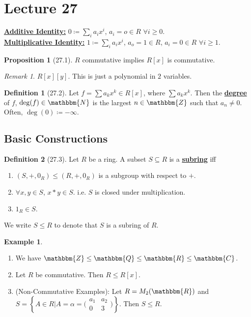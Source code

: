 \documentclass{article}
\newcommand{\N}{\mathbbm{N}}
\newcommand{\Z}{\mathbbm{Z}}
\newcommand{\Q}{\mathbbm{Q}}
\newcommand{\R}{\mathbbm{R}}
\newcommand{\C}{\mathbbm{C}}
\newcommand{\coleq}{\coloneqq}
\newcommand{\define}[1]{\textbf{\underline{#1}}}
\renewcommand{\Subset}{\subseteq}
\theoremstyle{definition}
\newtheorem*{defn}{Definition}
\newtheorem*{prop}{Proposition}
\newtheorem*{ex}{Example}
\theoremstyle{remark}
\newtheorem*{rmk}{Remark}
\begin{document}
    \section*{Lecture 27}{
        \define{Additive Identity:} $0\coleq \sum_i a_ix^i$, $a_i=o \in R$ $\forall i \geq 0$.\\
     
        \noindent\define{Multiplicative Identity:} $1\coleq \sum_i a_ix^i$, $a_o=1 \in R$, $a_i=0 \in R$ $\forall i \geq 1$.
     
        \begin{prop}[27.1]
            $R$ commutative implies $R[x]$ is commutative.
        \end{prop}
     
        \begin{rmk}
            $R[x][y]$. This is just a polynomial in $2$ variables.
        \end{rmk}
        
        \begin{defn}[27.2]
            Let $f=\sum a_kx^k \in R[x]$, where $\sum a_k x^k$. Then the \define{degree} of $f$, $\deg(f) \in \N$ is the largest $n \in \Z$ such that $a_n\neq 0$. Often, $\deg(0)\coleq -\infty$.
        \end{defn}
        
        \subsection*{Basic Constructions}{
            \begin{defn}[27.3]
                Let $R$ be a ring. A subset $S \Subset R$ is a \define{subring} iff
                \begin{enumerate}
                    \item $(S,+,0_R) \leq (R,+,0_R)$ is a subgroup with respect to $+$.
                    \item $\forall x,y \in S$, $x*y \in S$. i.e. $S$ is closed under multiplication.
                    \item $1_R \in S$.
                \end{enumerate}
                We write $S\leq R$ to denote that $S$ is a subring of $R$.
            \end{defn}
        }
            \begin{ex}
                \begin{enumerate}
                    \item We have $\Z \leq \Q \leq \R \leq \C$.
                    \item Let $R$ be commutative. Then $R \leq R[x]$.
                    \item (Non-Commutative Examples): Let $R=M_2(\R)$ and $S=\left\{A\in R|A=\alpha=\big(\begin{smallmatrix} a_1&a_2 \\ 0&3 \end{smallmatrix}\big)\right\}$. Then $S \leq R$.
                \end{enumerate}
            \end{ex}
            
}
\end{document}
